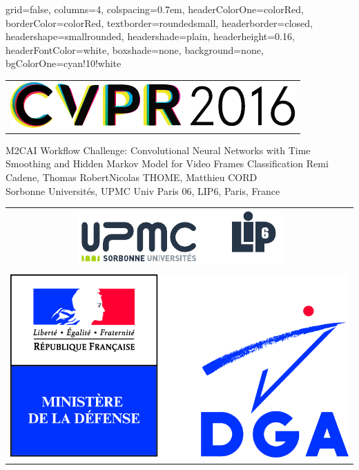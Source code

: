 \documentclass[landscape,a0paper,fontscale=0.292]{baposter}
\begin{document}
\begin{poster}{
 grid=false,
 columns=4,
 colspacing=0.7em,
 headerColorOne=colorRed,
 borderColor=colorRed,
 textborder=roundedsmall,
 headerborder=closed,
 headershape=smallrounded,
 headershade=plain,
 headerheight=0.16\textheight,
 headerFontColor=white,
 boxshade=none,
 background=none,
 bgColorOne=cyan!10!white}
 { 
    \begin{tabular}{c}
      \includegraphics{logo/CVPRLogo} \\
    \end{tabular}
 }
 {\sc M2CAI Workflow Challenge: Convolutional Neural Networks with Time\\ \vspace{3mm} Smoothing and Hidden Markov Model for Video Frames Classification  \vspace{0.1cm}}
 {Remi Cadene, Thomas RobertNicolas THOME, Matthieu CORD \vspace{0.1cm}\\
 {\small Sorbonne Universit\'{e}s, UPMC Univ Paris 06, LIP6, Paris, France}
 } %
 {
    \begin{tabular}{c}
      \includegraphics[height=0.048\textheight]{logo/logos.pdf}  \\
      \\
      \hspace{-10mm}
      \includegraphics[height=0.075\textheight]{logo/dga.jpg} \hspace{2mm}

\end{tabular}}
\end{poster}
\end{document}
